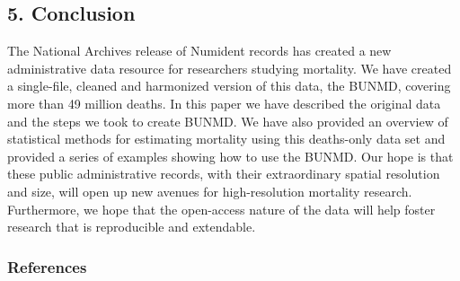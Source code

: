 \documentclass[
  11pt,
]{article}
\begin{document}
\hypertarget{conclusion}{%
\subsection{5. Conclusion}\label{conclusion}}

The National Archives release of Numident records has created a new
administrative data resource for researchers studying mortality. We have
created a single-file, cleaned and harmonized version of this data, the
BUNMD, covering more than 49 million deaths. In this paper we have
described the original data and the steps we took to create BUNMD. We
have also provided an overview of statistical methods for estimating
mortality using this deaths-only data set and provided a series of
examples showing how to use the BUNMD. Our hope is that these public
administrative records, with their extraordinary spatial resolution and
size, will open up new avenues for high-resolution mortality research.
Furthermore, we hope that the open-access nature of the data will help
foster research that is reproducible and extendable.

\newpage

\hypertarget{references}{%
\subsubsection*{References}\label{references}}
\end{document}
